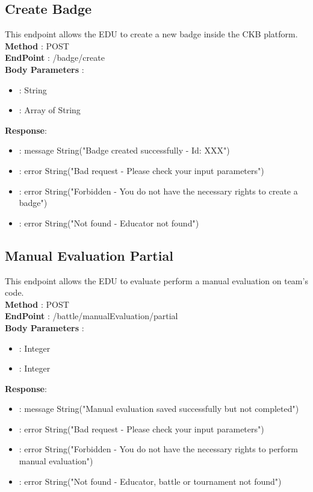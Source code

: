\subsection*{Create Badge}
This endpoint allows the EDU to create a new badge inside the CKB platform.\\
\textbf{Method} : POST \\
\textbf{EndPoint} : /badge/create \\
\textbf{Body Parameters} :
\begin{itemize}
    \item {} : String
    \item {} : Array of String
\end{itemize}
\textbf{Response}:
\begin{itemize}
    \item {} : message String("Badge created successfully - Id: XXX")
    \item {} : error String("Bad request - Please check your input parameters")
    \item {} : error String("Forbidden - You do not have the necessary rights to create a badge")
    \item {} : error String("Not found - Educator not found")
\end{itemize}

\subsection*{Manual Evaluation Partial}
This endpoint allows the EDU to evaluate perform a manual evaluation on team's code.\\
\textbf{Method} : POST \\
\textbf{EndPoint} : /battle/manualEvaluation/partial \\
\textbf{Body Parameters} :
\begin{itemize}
    \item {} : Integer
    \item {} : Integer
\end{itemize}
\textbf{Response}:
\begin{itemize}
    \item {} : message String("Manual evaluation saved successfully but not completed")
    \item {} : error String("Bad request - Please check your input parameters")
    \item {} : error String("Forbidden - You do not have the necessary rights to perform manual evaluation")
    \item {} : error String("Not found - Educator, battle or tournament not found")
\end{itemize}

